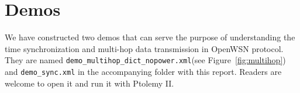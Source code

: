\appendix
\section{Demos}

We have constructed two demos that can serve the purpose of understanding the time synchronization and multi-hop data transmission in OpenWSN protocol. They are named \verb+demo_multihop_dict_nopower.xml+(see Figure~\ref{fig:multihop}) and \verb+demo_sync.xml+ in the accompanying folder with this report. Readers are welcome to open it and run it with Ptolemy II. 



